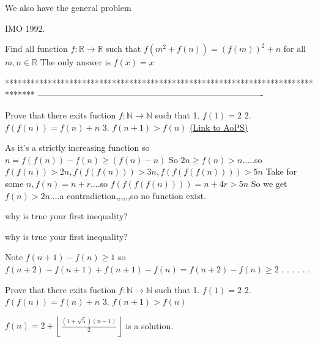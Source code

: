 \begin{solution}
	We also have the general problem
\begin{bolded}IMO 1992.\end{bolded} Find all function $f : \mathbb{R} \rightarrow \mathbb{R}$ such that $f(m^2 + f(n)) = (f(m))^2 + n$ for all $m , n \in \mathbb{R}$
The only answer is $f(x)=x$
\end{solution}
*******************************************************************************
-------------------------------------------------------------------------------

\begin{problem}
	Prove that there exits fuction $f: \mathbb{N} \to \mathbb{N}$ such that
1. $f(1)=2$
2. $f(f(n))=f(n)+n$
3. $f(n+1) > f(n)$
	\flushright \href{https://artofproblemsolving.com/community/c6h485786}{(Link to AoPS)}
\end{problem}



\begin{solution}
	As it's a strictly increasing function so $n=f(f(n))-f(n)\geq (f(n)-n)$
So $2n\geq f(n)>n$.....so $f(f(n))>2n,f(f(f(n)))>3n,f(f(f(f(n))))>5n$
Take for some $n, f(n)=n+r$....so $f(f(f(f(n))))=n+4r>5n$
So we get $f(n)>2n$....a contradiction,,,,,,so no function exist.
\end{solution}



\begin{solution}
	why is true your first inequality?
\end{solution}



\begin{solution}
	\begin{tcolorbox}why is true your first inequality?\end{tcolorbox}

Note $f(n+1)-f(n)\geq 1$
so $f(n+2)-f(n+1)+f(n+1)-f(n)=f(n+2)-f(n) \geq 2$
.
.
.
.
.
.
\end{solution}



\begin{solution}
	\begin{tcolorbox}Prove that there exits fuction $f: \mathbb{N} \to \mathbb{N}$ such that
1. $f(1)=2$
2. $f(f(n))=f(n)+n$
3. $f(n+1) > f(n)$\end{tcolorbox}
$f(n)=2+\left\lfloor\frac{(1+\sqrt 5)(n-1)}2\right\rfloor$ is a solution.
\end{solution}



